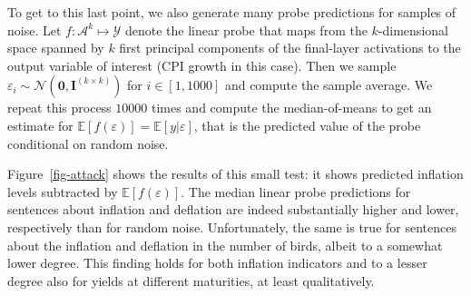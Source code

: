 \documentclass{article}
\theoremstyle{plain}
\newtheorem{proposition}[theorem]{Proposition}
\theoremstyle{definition}
\theoremstyle{remark}
\begin{document}
To get to this last point, we also generate many probe predictions for samples of noise. Let \(f: \mathcal{A}^k \mapsto \mathcal{Y}\) denote the linear probe that maps from the \(k\)-dimensional space spanned by \(k\) first principal components of the final-layer activations to the output variable of interest (CPI growth in this case). Then we sample \(\varepsilon_i \sim \mathcal{N}(\mathbf{0},\mathbf{I}^{(k \times k)})\) for \(i \in [1,1000]\) and compute the sample average. We repeat this process \(10000\) times and compute the median-of-means to get an estimate for \(\mathbb{E}[f(\varepsilon)]=\mathbb{E}[y|\varepsilon]\), that is the predicted value of the probe conditional on random noise.

Figure~\ref{fig-attack} shows the results of this small test: it shows predicted inflation levels subtracted by \(\mathbb{E}[f(\varepsilon)]\). The median linear probe predictions for sentences about inflation and deflation are indeed substantially higher and lower, respectively than for random noise. Unfortunately, the same is true for sentences about the inflation and deflation in the number of birds, albeit to a somewhat lower degree. This finding holds for both inflation indicators and to a lesser degree also for yields at different maturities, at least qualitatively.




\end{document}
